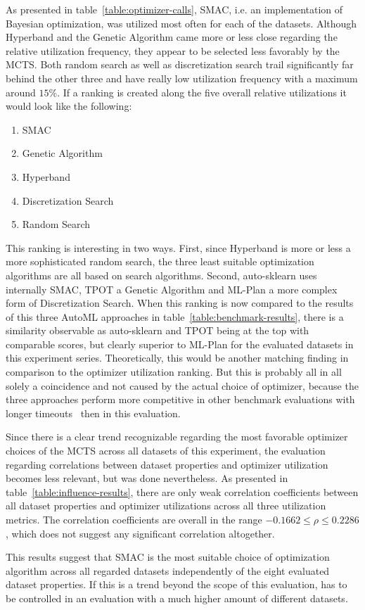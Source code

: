 As presented in table~\ref{table:optimizer-calls}, SMAC, i.e. an implementation of Bayesian optimization, was utilized most often for each of the datasets.
Although Hyperband and the Genetic Algorithm came more or less close regarding the relative utilization frequency, they appear to be selected less favorably by the MCTS.
Both random search as well as discretization search trail significantly far behind the other three and have really low utilization frequency with a maximum around $15\%$.\newline
If a ranking is created along the five overall relative utilizations it would look like the following:
\begin{enumerate}
    \item SMAC
    \item Genetic Algorithm
    \item Hyperband
    \item Discretization Search
    \item Random Search
\end{enumerate}
This ranking is interesting in two ways.
First, since Hyperband is more or less a more sophisticated random search, the three least suitable optimization algorithms are all based on search algorithms.\newline
Second, auto-sklearn uses internally SMAC, TPOT a Genetic Algorithm and ML-Plan a more complex form of Discretization Search.
When this ranking is now compared to the results of this three AutoML approaches in table~\ref{table:benchmark-results}, there is a similarity observable as auto-sklearn and TPOT being at the top with comparable scores, but clearly superior to ML-Plan for the evaluated datasets in this experiment series.
Theoretically, this would be another matching finding in comparison to the optimizer utilization ranking.
But this is probably all in all solely a coincidence and not caused by the actual choice of optimizer, because the three approaches perform more competitive in other benchmark evaluations with longer timeouts~\cite{Mohr-ML-Plan} then in this evaluation.

Since there is a clear trend recognizable regarding the most favorable optimizer choices of the MCTS across all datasets of this experiment, the evaluation regarding correlations between dataset properties and optimizer utilization becomes less relevant, but was done nevertheless.\newline
As presented in table~\ref{table:influence-results}, there are only weak correlation coefficients between all dataset properties and optimizer utilizations across all three utilization metrics.
The correlation coefficients are overall in the range $-0.1662 \leq \rho \leq 0.2286$, which does not suggest any significant correlation altogether.

This results suggest that SMAC is the most suitable choice of optimization algorithm across all regarded datasets independently of the eight evaluated dataset properties.
If this is a trend beyond the scope of this evaluation, has to be controlled in an evaluation with a much higher amount of different datasets.
